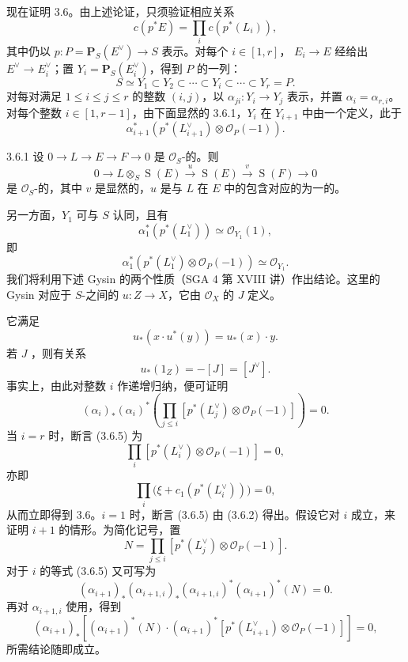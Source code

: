 现在证明 3.6。由上述论证，只须验证相应关系
\[
 c(p^*E)=\prod_i c(p^*(L_i)),
\]
其中仍以 $p:P=\mathbf P_S(E^\vee)\to S$ 表示。对每个 $i\in[1,r]$， $E_i\to E$ 经给出 $E^\vee\to E_i^\vee$；置 $Y_i=\mathbf P_S(E_i^\vee)$，得到 $P$ 的一列：
\[
 S\simeq Y_1\subset Y_2\subset\cdots\subset Y_i\subset\cdots\subset Y_r=P.
\]
对每对满足 $1\le i\le j\le r$ 的整数 $(i,j)$，以 $\alpha_{ji}:Y_i\to Y_j$ 表示，并置 $\alpha_i=\alpha_{r,i}$。对每个整数 $i\in[1,r-1]$，由下面显然的 3.6.1，$Y_i$ 在 $Y_{i+1}$ 中由一个定义，此于
\[
 \alpha_{i+1}^*(p^*(L_{i+1}^\vee)\otimes\mathscr O_P(-1)).
\]

\begin{SGAresult}{}{3.6.1}
设 $0\to L\to E\to F\to0$ 是 $\mathscr O_S$-的。则
\[
 0\longrightarrow L\otimes_S\operatorname S(E)\xrightarrow{u}\operatorname S(E)
 \xrightarrow{v}\operatorname S(F)\longrightarrow0
\]
是 $\mathscr O_S$-的，其中 $v$ 是显然的，$u$ 是与 $L$ 在 $E$ 中的包含对应的为一的。
\end{SGAresult}

另一方面，$Y_1$ 可与 $S$ 认同，且有
\[
 \alpha_1^*(p^*(L_1^\vee))\simeq\mathscr O_{Y_1}(1),
\]
即
\[
 \alpha_1^*(p^*(L_1^\vee)\otimes\mathscr O_P(-1))\simeq\mathscr O_{Y_1}.\tag{3.6.2}
\]
我们将利用下述 Gysin 的两个性质（SGA 4 第 XVIII 讲）作出结论。这里的 Gysin 对应于 $S$-之间的 $u:Z\to X$，它由 $\mathscr O_X$ 的 $J$ 定义。

它满足
\[
 u_*(x\cdot u^*(y))=u_*(x)\cdot y.\tag{3.6.3}
\]
若 $J$ ，则有关系
\[
 u_*(1_Z)=-[J]=[J^\vee].\tag{3.6.4}
\]
事实上，由此对整数 $i$ 作递增归纳，便可证明
\[
 (\alpha_i)_*(\alpha_i)^*\left(\prod_{j\le i}[p^*(L_j^\vee)\otimes\mathscr O_P(-1)]\right)=0.\tag{3.6.5}
\]
当 $i=r$ 时，断言 (3.6.5) 为
\[
 \prod_i[p^*(L_i^\vee)\otimes\mathscr O_P(-1)]=0,
\]
亦即
\[
 \prod_i\bigl(\xi+c_1(p^*(L_i^\vee))\bigr)=0,
\]
从而立即得到 3.6。$i=1$ 时，断言 (3.6.5) 由 (3.6.2) 得出。假设它对 $i$ 成立，来证明 $i+1$ 的情形。为简化记号，置
\[
 N=\prod_{j\le i}[p^*(L_j^\vee)\otimes\mathscr O_P(-1)].
\]
对于 $i$ 的等式 (3.6.5) 又可写为
\[
 (\alpha_{i+1})_*(\alpha_{i+1,i})_*(\alpha_{i+1,i})^*(\alpha_{i+1})^*(N)=0.
\]
再对 $\alpha_{i+1,i}$ 使用，得到
\[
 (\alpha_{i+1})_*\left[(\alpha_{i+1})^*(N)\cdot
 (\alpha_{i+1})^*[p^*(L_{i+1}^\vee)\otimes\mathscr O_P(-1)]\right]=0,
\]
所需结论随即成立。

